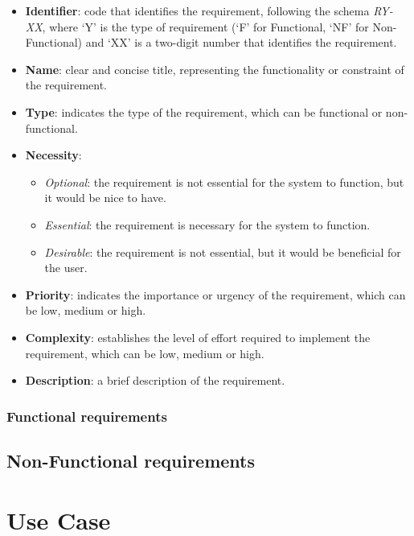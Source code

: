 \begin{itemize}
    \item \textbf{Identifier}: code that identifies the requirement, following the schema \textit{RY-XX}, where `Y' is the type of requirement (`F' for Functional, `NF' for Non-Functional) and `XX' is a two-digit number that identifies the requirement.
    \item \textbf{Name}: clear and concise title, representing the functionality or constraint of the requirement.
    \item \textbf{Type}: indicates the type of the requirement, which can be functional or non-functional.
    \item \textbf{Necessity}: 
        \begin{itemize}
            \item \textit{Optional}: the requirement is not essential for the system to function, but it would be nice to have.
            \item \textit{Essential}: the requirement is necessary for the system to function.
            \item \textit{Desirable}: the requirement is not essential, but it would be beneficial for the user.
        \end{itemize}
    \item \textbf{Priority}: indicates the importance or urgency of the requirement, which can be low, medium or high.
    \item \textbf{Complexity}: establishes the level of effort required to implement the requirement, which can be low, medium or high.
    \item \textbf{Description}: a brief description of the requirement.
\end{itemize}


\subsubsection{Functional requirements}



\subsection{Non-Functional requirements}




\section{Use Case}\label{sec:use-case}

